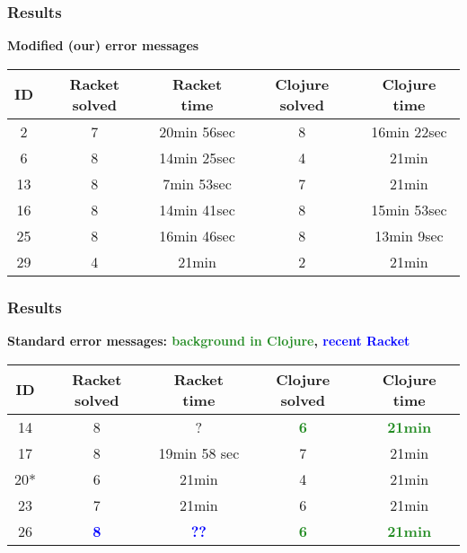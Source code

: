 \documentclass{beamer}
\newcommand{\comment}[1]{{\bf \tt  {#1}}}
\newcommand{\emcomment}[1]{\textcolor{ForestGreen}{\comment{Elena: {#1}}}}
\newcommand{\R}[1]{\textcolor{blue}{\bf {#1}}}
\newcommand{\Cl}[1]{\textcolor{ForestGreen}{\bf {#1}}}
\begin{document}
\begin{frame}
\frametitle{Results}
{\bf Modified (our) error messages}
\vspace{0.1in}

\begin{tabular}{c | c| c| c | c }
\hline
{\bf ID} & {\bf Racket solved} & {\bf Racket time} & {\bf Clojure solved} & {\bf Clojure time} \\
\hline 
2 & 7  & 20min 56sec & 8 & 16min 22sec  \\
6 &  8  & 14min 25sec &  4  &  21min \\
13 &  8 & 7min 53sec &  7 &  21min \\
16 &  8  & 14min 41sec &  8  &  15min 53sec \\
25 &  8  & 16min 46sec &  8  &  13min 9sec \\
29 &  4  & 21min &  2  &  21min \\
\hline
\end{tabular}
\end{frame}

\begin{frame}
\frametitle{Results}
{\bf Standard error messages: \Cl{background in Clojure}, \R{recent Racket}}
\vspace{0.1in}

\begin{tabular}{c | c| c| c | c }
\hline
{\bf ID} & {\bf Racket solved} & {\bf Racket time} & {\bf Clojure solved} & {\bf Clojure time} \\
\hline 
14 &  8 & ? &  \Cl{6}  &  \Cl{21min} \\
17 &  8 & 19min 58 sec &  7 &  21min \\
20* &  6 & 21min &  4 &  21min \\
23 &  7 & 21min &  6  &  21min \\
26 &  \R{8} & \R{??} &  \Cl{6} &  \Cl{21min} \\
\hline
\end{tabular}


\end{frame}
\end{document}
